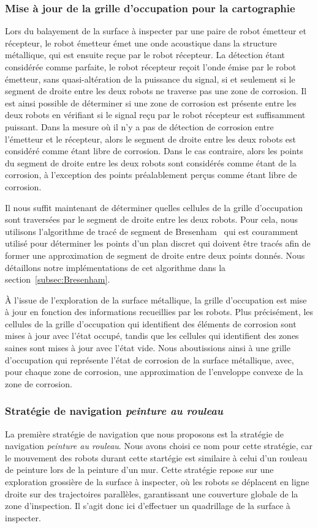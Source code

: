 \documentclass[francais,RandD]{rapportPFE}
\begin{document}
			\subsubsection*{Mise à jour de la grille d'occupation pour la cartographie}
				Lors du balayement de la surface à inspecter par une paire de robot émetteur et récepteur, le robot émetteur émet une onde acoustique dans la structure métallique, qui est ensuite reçue par le robot récepteur.
				La détection étant considérée comme parfaite, le robot récepteur reçoit l'onde émise par le robot émetteur, sans quasi-altération de la puissance du signal, si et seulement si le segment de droite entre les deux robots ne traverse pas une zone de corrosion.
				Il est ainsi possible de déterminer si une zone de corrosion est présente entre les deux robots en vérifiant si le signal reçu par le robot récepteur est suffisamment puissant.
				Dans la mesure où il n'y a pas de détection de corrosion entre l'émetteur et le récepteur, alors le segment de droite entre les deux robots est considéré comme étant libre de corrosion.
				Dans le cas contraire, alors les points du segment de droite entre les deux robots sont considérés comme étant de la corrosion, à l'exception des points préalablement perçus comme étant libre de corrosion.

				Il nous suffit maintenant de déterminer quelles cellules de la grille d'occupation sont traversées par le segment de droite entre les deux robots.
				Pour cela, nous utilisons l'algorithme de tracé de segment de Bresenham~\cite{enwiki:1155124335} qui est couramment utilisé pour déterminer les points d'un plan discret qui doivent être tracés afin de former une approximation de segment de droite entre deux points donnés.
				Nous détaillons notre implémentations de cet algorithme dans la section~\ref{subsec:Bresenham}.

				À l'issue de l'exploration de la surface métallique, la grille d'occupation est mise à jour en fonction des informations recueillies par les robots.
				Plus précisément, les cellules de la grille d'occupation qui identifient des éléments de corrosion sont mises à jour avec l'état occupé, tandis que les cellules qui identifient des zones saines sont mises à jour avec l'état vide.
				Nous aboutissions ainsi à une grille d'occupation qui représente l'état de corrosion de la surface métallique, avec, pour chaque zone de corrosion, une approximation de l'enveloppe convexe de la zone de corrosion.
			\subsubsection*{Stratégie de navigation \textit{peinture au rouleau}}
				La première stratégie de navigation que nous proposons est la stratégie de navigation \textit{peinture au rouleau}.
				Nous avons choisi ce nom pour cette stratégie, car le mouvement des robots durant cette startégie est similaire à celui d'un rouleau de peinture lors de la peinture d'un mur.
				Cette stratégie repose sur une exploration grossière de la surface à inspecter, où les robots se déplacent en ligne droite sur des trajectoires parallèles, garantissant une couverture globale de la zone d'inspection.
				Il s'agit donc ici d'effectuer un quadrillage de la surface à inspecter.
\end{document}
